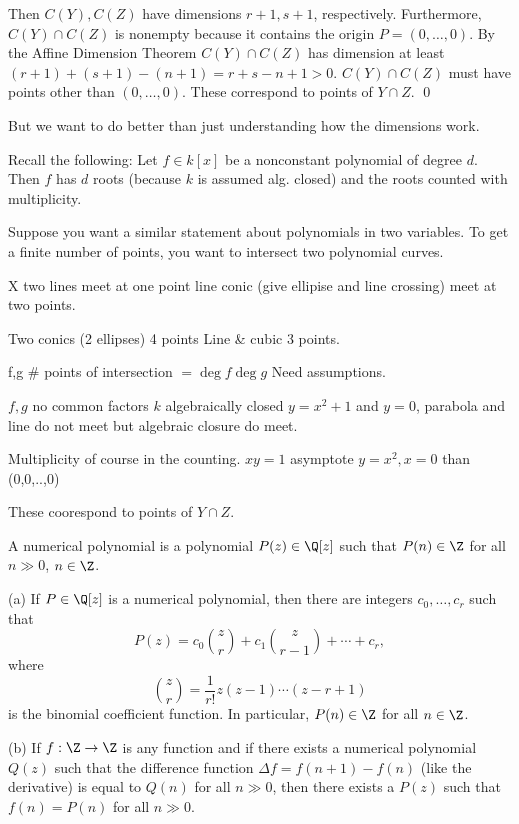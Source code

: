 Then $C(Y), C(Z)$ have dimensions $r+1, s+1$, respectively. Furthermore, $C(Y) \cap C(Z)$ is nonempty because it contains the origin $P= (0,\ldots,0)$. By the Affine Dimension Theorem $C(Y) \cap C(Z)$ has dimension at least $(r+1)+(s+1)-(n+1)= r+s-n+1 > 0$. $C(Y) \cap C(Z)$ must have points other than $(0,\ldots,0)$. These correspond to points of $Y \cap Z$. \qed


But we want to do better than just understanding how the dimensions work.


Recall the following: Let $f \in k[x]$ be a nonconstant polynomial of degree $d$. Then $f$ has $d$ roots (because $k$ is assumed alg. closed) and the roots counted with multiplicity. 

Suppose you want a similar statement about polynomials in two variables. To get a finite number of points, you want to intersect two polynomial curves. 

X two lines meet at one point
line conic (give ellipise and line crossing) meet at two points.

Two conics (2 ellipses) 4 points
Line \& cubic 3 points.

f,g \# points of intersection $= \deg f \deg g$ Need assumptions.

$f,g$ no common factors
$k$ algebraically closed
$y= x^2+1$ and $y=0$, parabola and line do not meet but algebraic closure do meet.

Multiplicity of course in the counting. 
$xy=1$ asymptote
$y=x^2, x=0$ than (0,0,..,0)

These coorespond to points of $Y \cap Z$.


\begin{dfn}
A numerical polynomial is a polynomial $P(z) \in \Q[z]$ such that $P(n) \in \Z$ for all $n \gg 0$, $n \in \Z$.
\end{dfn}


\begin{prop}
(a) If $P \in \Q[z]$ is a numerical polynomial, then there are integers $c_0,\ldots,c_r$ such that 
	\[
	P(z)= c_0 \binom{z}{r} + c_1 \binom{z}{r-1} + \cdots + c_r,
	\]
where
	\[
	\binom{z}{r}= \dfrac{1}{r!} z(z-1)\cdots(z-r+1)
	\]
is the binomial coefficient function. In particular, $P(n) \in \Z$ for all $n \in \Z$.

(b) If $f: \Z \to \Z$ is any function and if there exists a numerical polynomial $Q(z)$ such that the difference function $\Delta f= f(n+1) - f(n)$ (like the derivative) is equal to $Q(n)$ for all $n \gg 0$, then there exists a $P(z)$ such that $f(n)= P(n)$ for all $n \gg 0$. 
\end{prop}






























